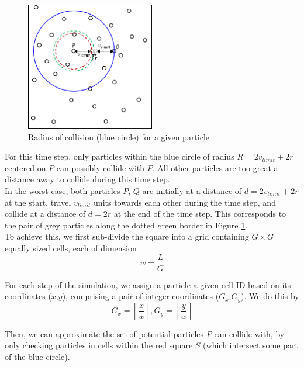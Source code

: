 \documentclass[12pt]{article}
\begin{document}
\begin{figure}[H]
    \centering
    \includegraphics[width=0.5\textwidth]{chap8RadOfCollision}
    \caption{Radius of collision (blue circle) for a given particle}
    \label{fig:chap8RadOfCollision}
\end{figure}

For this time step, only particles within the blue circle of radius $R=2v_{limit}+2r$ centered on $P$ can possibly collide with $P$. All other particles are too great a distance away to collide during this time step. \\

In the worst case, both particles $P$, $Q$ are initially at a distance of $d=2v_{limit}+2r$ at the start, travel $v_{limit}$ units towards each other during the time step, and collide at a distance of $d=2r$ at the end of the time step. This corresponds to the pair of grey particles along the dotted green border in Figure \ref{fig:chap8RadOfCollision}. \\

To achieve this, we first sub-divide the square into a grid containing $G \times G$ equally sized cells, each of dimension
$$w = \frac{L}{G}$$

For each step of the simulation, we assign a particle a given cell ID based on its coordinates ($x$,$y$), comprising a pair of integer coordinates ($G_x$,$G_y$). We do this by
$$G_x = \left\lfloor{\frac{x}{w}}\right\rfloor, G_y = \left\lfloor{\frac{y}{w}}\right\rfloor$$

Then, we can approximate the set of potential particles $P$ can collide with, by only checking particles in cells within the red square $S$ (which intersect some part of the blue circle). \\
\end{document}
